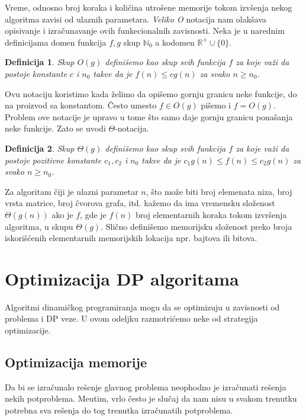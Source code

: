 \documentclass[a4paper,12pt]{article}
\numberwithin{equation}{subsection}
\newtheorem{dfn}{Definicija}[section]
\begin{document}
Vreme, odnosno broj koraka i koli\v cina utro\v sene memorije tokom izv\v senja nekog algoritma zavisi od ulaznih parametara. \textit{Veliko O} notacija nam olak\v sava opisivanje i izra\v cunavanje ovih funkecionalnih zavisnosti. Neka je u narednim definicijama domen funkcija $f, g$ skup $\mathbb{N}_0$ a kodomen $\mathbb{R}^{+} \cup \{ 0 \}$.

\begin{dfn}
Skup $O(g)$ defini\v semo kao skup svih funkcija $f$ za koje va\v zi da postoje konstante $c$ i $n_0$ takve da je $f(n) \leq c g(n)$ za svako $n \geq n_0$.
\end{dfn}

Ovu notaciju koristimo kada \v zelimo da opi\v semo gornju granicu neke funkcije, do na proizvod sa konstantom. \v Cesto umesto $f \in O(g)$ pi\v semo i $f = O(g)$. Problem ove notacije je upravo u tome \v sto samo daje gornju granicu pona\v sanja neke funkcije. Zato se uvodi $\Theta$-notacija.

\begin{dfn}
Skup $\Theta(g)$ defini\v semo kao skup svih funkcija $f$ za koje va\v zi da postoje pozitivne konstante $c_1, c_2$ i $n_0$ takve da je $c_1 g(n) \leq f(n) \leq c_2 g(n)$ za svako $n \geq n_0$.
\end{dfn}

Za algoritam \v ciji je ulazni parametar $n$, \v sto mo\v ze biti broj elemenata niza, broj vrsta matrice, broj \v cvorova grafa, itd. ka\v zemo da ima vremensku slo\v zenost $\Theta(g(n))$ ako je $f$, gde je $f(n)$ broj elementarnih koraka tokom izvr\v senja algoritma, u skupu $\Theta(g)$. Sli\v cno defini\v semo memorijsku slo\v zenost preko broja iskori\v s\' cenih elementarnih memorijskih lokacija npr. bajtova ili bitova.

\section{Optimizacija DP algoritama}

Algoritmi dinami\v ckog programiranja mogu da se optimizuju u zavisnosti od problema i DP veze. U ovom odeljku razmotri\' cemo neke od strategija optimizacije.

\subsection{Optimizacija memorije} \label{sec:optmem}

Da bi se izra\v cunalo re\v senje glavnog problema neophodno je izra\v cunati re\v senja nekih potproblema. Me\dj utim, vrlo \v cesto je slu\v caj da nam nisu u svakom trenutku potrebna sva re\v senja do tog trenutka izra\v cunatih potproblema.
\end{document}
